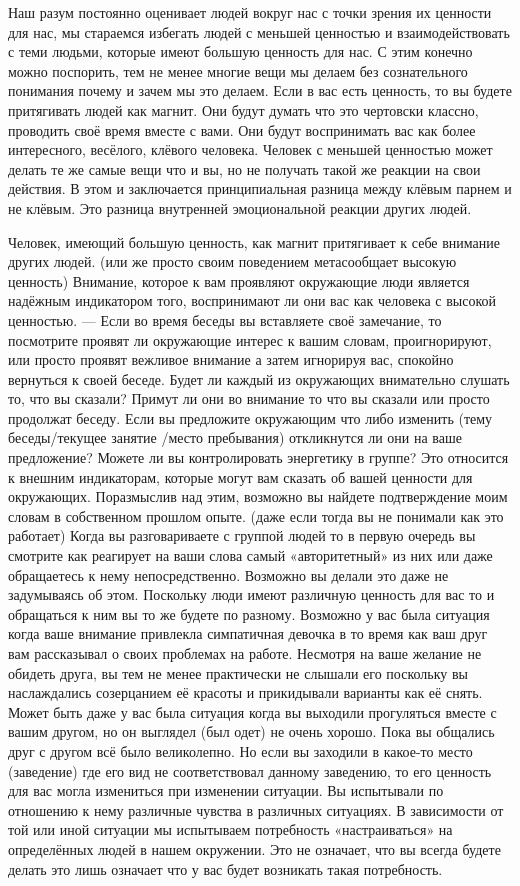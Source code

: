 \RULE  Наш разум постоянно оценивает людей вокруг нас с точки зрения их ценности для нас, мы стараемся избегать людей с меньшей ценностью и взаимодействовать с теми людьми, которые имеют большую ценность для нас. С этим конечно можно поспорить, тем не менее многие вещи мы делаем без сознательного понимания почему и зачем мы это делаем. Если в вас есть ценность, то вы будете притягивать людей как магнит. Они будут думать что это чертовски классно, проводить своё время вместе с вами. Они будут воспринимать вас как более интересного, весёлого, клёвого человека. Человек с меньшей ценностью может делать те же самые вещи что и вы, но не получать такой же реакции на свои действия. В этом и заключается принципиальная разница между клёвым парнем и не клёвым. Это разница внутренней эмоциональной реакции других людей.

\RULE  Человек, имеющий большую ценность, как магнит притягивает к себе внимание других людей. (или же просто своим поведением метасообщает высокую ценность) Внимание, которое к вам проявляют окружающие люди является надёжным индикатором того, воспринимают ли они вас как человека с высокой ценностью. --- Если во время беседы вы вставляете своё замечание, то посмотрите проявят ли окружающие интерес к вашим словам, проигнорируют, или просто проявят вежливое внимание а затем игнорируя вас, спокойно вернуться к своей беседе. Будет ли каждый из окружающих внимательно слушать то, что вы сказали? Примут ли они во внимание то что вы сказали или просто продолжат беседу. Если вы предложите окружающим что либо изменить (тему беседы/текущее занятие /место пребывания) откликнутся ли они на ваше предложение? Можете ли вы контролировать энергетику в группе? Это относится к внешним индикаторам, которые могут вам сказать об вашей ценности для окружающих. Поразмыслив над этим, возможно вы найдете подтверждение моим словам в собственном прошлом опыте. (даже если тогда вы не понимали как это работает) Когда вы разговариваете с группой людей то в первую очередь вы смотрите как реагирует на ваши слова самый «авторитетный» из них или даже обращаетесь к нему непосредственно. Возможно вы делали это даже не задумываясь об этом. Поскольку люди имеют различную ценность для вас то и обращаться к ним вы то же будете по разному. Возможно у вас была ситуация когда ваше внимание привлекла симпатичная девочка в то время как ваш друг вам рассказывал о своих проблемах на работе. Несмотря на ваше желание не обидеть друга, вы тем не менее практически не слышали его поскольку вы наслаждались созерцанием её красоты и прикидывали варианты как её снять. Может быть даже у вас была ситуация когда вы выходили прогуляться вместе с вашим другом, но он выглядел (был одет) не очень хорошо. Пока вы общались друг с другом всё было великолепно. Но если вы заходили в какое-то место (заведение) где его вид не соответствовал данному заведению, то его ценность для вас могла измениться при изменении ситуации. Вы испытывали по отношению к нему различные чувства в различных ситуациях. В зависимости от той или иной ситуации мы испытываем потребность «настраиваться» на определённых людей в нашем окружении. Это не означает, что вы всегда будете делать это лишь означает что у вас будет возникать такая потребность.

